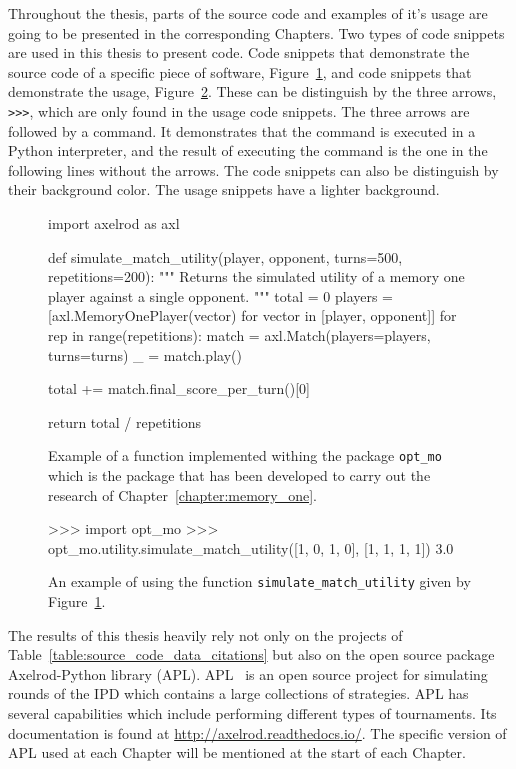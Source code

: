 Throughout the thesis, parts of the source code and examples of it's usage are
going to be presented in the corresponding Chapters. Two types of code snippets
are used in this thesis to present code. Code snippets that demonstrate the
source code of a specific piece of software, Figure~\ref{figure:source_code_example}, and
code snippets that demonstrate the usage,
Figure~\ref{figure:usage_code_example}. These can be distinguish by the three arrows,
\texttt{>>>}, which are only found in the usage code snippets.
The three arrows are followed by a command. It
demonstrates that the command is executed in a Python interpreter, and the result of executing the command
is the one in the following lines without the arrows.
The code snippets can also be distinguish by their background color. The usage
snippets have a lighter background.

\begin{figure}[htbp]
\begin{sourcepy}
import axelrod as axl

def simulate_match_utility(player, opponent, turns=500, repetitions=200):
    """
    Returns the simulated utility of a memory one player against a single opponent.
    """
    total = 0
    players = [axl.MemoryOnePlayer(vector) for vector in [player, opponent]]
    for rep in range(repetitions):
        match = axl.Match(players=players, turns=turns)
        _ = match.play()

        total += match.final_score_per_turn()[0]

    return total / repetitions
\end{sourcepy}
\caption{Example of a function implemented withing the package
\texttt{opt_mo} which is the package that has been developed to
carry out the research of Chapter~\ref{chapter:memory_one}.}\label{figure:source_code_example}
\end{figure}

\begin{figure}[htbp]
\begin{usagepy}
>>> import opt_mo
>>> opt_mo.utility.simulate_match_utility([1, 0, 1, 0], [1, 1, 1, 1])
3.0

\end{usagepy}
\caption{An example of using the function \texttt{simulate_match_utility}
given by Figure~\ref{figure:source_code_example}.}\label{figure:usage_code_example}
\end{figure}

The results of this thesis heavily rely not only on the projects of
Table~\ref{table:source_code_data_citations} but also on the open source package
Axelrod-Python library (APL). APL~\cite{axelrodproject} is an open source
project for simulating rounds of the IPD which contains a large collections of
strategies. APL has several capabilities which include performing different
types of tournaments. Its documentation is found at
\url{http://axelrod.readthedocs.io/}. The specific version of APL used at each
Chapter will be mentioned at the start of each Chapter.

